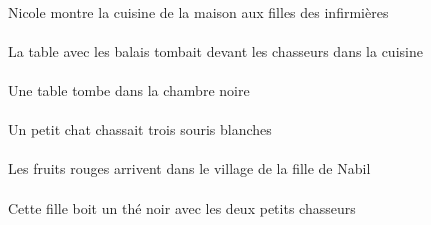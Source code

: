\begin{exe}
\INDSgErgP{}   \NicoleBSgErgP{}    \DEFPlDatP{}    \DEFPlOblP{}   \infirmiereAPlOblP{}   \DEP{}   \filleCPlDatP{}   \DEFSgAbsP{}    \DEFSgOblP{}   \maisonDSgOblP{}   \DEP{}   \cuisineDSgAbsP{}  \montrerVdPrsDSgP{}\\
Nicole montre la cuisine de la maison aux filles des infirmières
\ex\gll
\DEFSgAbs{}    \DEFPlObl{}   \balaiAPlObl{}   \AVEC{}   \tableDSgAbs{}    \DEFPlObl{}    \DEFSgObl{}   \cuisineDSgObl{}   \DANS{}   \chasseurCPlObl{}   \DEVANT{}  \tomberViPstDSg{}\\
\DEFSgAbsP{}    \DEFPlOblP{}   \balaiAPlOblP{}   \AVECP{}   \tableDSgAbsP{}    \DEFPlOblP{}    \DEFSgOblP{}   \cuisineDSgOblP{}   \DANSP{}   \chasseurCPlOblP{}   \DEVANTP{}  \tomberViPstDSgP{}\\
La table avec les balais tombait devant les chasseurs dans la cuisine
\ex\gll
\DEFSgObl{}   \noirBSg{}   \chambreBSgObl{}   \DANS{}   \INDSgAbs{}   \tableDSgAbs{}  \tomberViPrsDSg{}\\
\DEFSgOblP{}   \noirBSgP{}   \chambreBSgOblP{}   \DANSP{}   \INDSgAbsP{}   \tableDSgAbsP{}  \tomberViPrsDSgP{}\\
Une table tombe dans la chambre noire
\ex\gll
\INDSgErg{}   \petitDSg{}   \chatDSgErg{}   \INDPlAbs{}   \troisBPl{}   \blancBPl{}   \sourisBPlAbs{}  \chasserVtPstBPl{}\\
\INDSgErgP{}   \petitDSgP{}   \chatDSgErgP{}   \INDPlAbsP{}   \troisBPlP{}   \blancBPlP{}   \sourisBPlAbsP{}  \chasserVtPstBPlP{}\\
Un petit chat chassait trois souris blanches
\ex\gll
\DEFPlAbs{}   \rougeAPl{}   \fruitAPlAbs{}    \DEFSgObl{}    \DEFSgObl{}    \INDSgObl{}   \NabilDSgObl{}   \DE{}   \filleCSgObl{}   \DE{}   \villageCSgObl{}   \DANS{}  \arriverViPrsAPl{}\\
\DEFPlAbsP{}   \rougeAPlP{}   \fruitAPlAbsP{}    \DEFSgOblP{}    \DEFSgOblP{}    \INDSgOblP{}   \NabilDSgOblP{}   \DEP{}   \filleCSgOblP{}   \DEP{}   \villageCSgOblP{}   \DANSP{}  \arriverViPrsAPlP{}\\
Les fruits rouges arrivent dans le village de la fille de Nabil
\ex\gll
\DEFDuObl{}   \petitCDu{}   \chasseurCDuObl{}   \AVEC{}   \DEMSgErg{}   \filleCSgErg{}   \INDSgAbs{}   \noirBSg{}   \theBSgAbs{}  \boireVtPrsBSg{}\\
\DEFDuOblP{}   \petitCDuP{}   \chasseurCDuOblP{}   \AVECP{}   \DEMSgErgP{}   \filleCSgErgP{}   \INDSgAbsP{}   \noirBSgP{}   \theBSgAbsP{}  \boireVtPrsBSgP{}\\
Cette fille boit un thé noir avec les deux petits chasseurs
\ex\gll
\DEFDuAbs{}   \blancDDu{}   \chatDDuAbs{}    \DEFSgObl{}   \basDSg{}   \tableDSgObl{}   \SUR{}  \dormirViPrsDDu{}\\

\end{exe}

